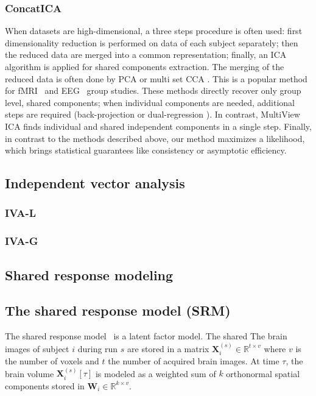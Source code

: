 \documentclass{report}
\begin{document}
\subsubsection{ConcatICA}
When datasets are high-dimensional, a three steps procedure is often used: first dimensionality reduction is performed on data of each subject  separately; then the reduced data are merged into a common representation; finally, an ICA algorithm is applied for shared components extraction. The merging of the reduced data is often done by PCA \cite{calhoun2001method} or multi set CCA \cite{varoquaux2009canica}.
This is a popular method for fMRI~\cite{calhoun2009review} and EEG~\cite{eichele2011eegift} group studies.
These methods directly recover only group level, shared components; when individual components are needed, additional steps are required (back-projection \cite{calhoun2001method} or dual-regression \cite{beckmann2009group}).
%
In contrast, MultiView ICA finds individual and shared independent components in a single step.
%
%
Finally, in contrast to the methods described above, our method maximizes a likelihood, which brings statistical guarantees like consistency or asymptotic efficiency.
\subsection{Independent vector analysis}
\subsubsection{IVA-L}
\subsubsection{IVA-G}
\subsection{Shared response modeling}

\subsection{The shared response model (SRM)}
The shared response model~\cite{chen2015reduced} is a latent factor model.
The shared 
The brain images of subject $i$ during run $s$ are stored in a matrix $\mathbf{X}^{(s)}_i \in\mathbb{R}^{t \times v}$ where $v$ is the number of voxels and $t$ the number of acquired brain images.
%
At time $\tau$, the brain volume $\mathbf{X}^{(s)}_i[\tau]$  is modeled as a weighted sum of $k$ orthonormal spatial components stored in $\mathbf{W}_i \in\mathbb{R}^{k \times v}$.
%
\end{document}
